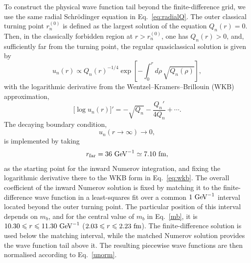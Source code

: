 \documentclass[aps,prd,showpacs,amsmath,twocolumn,superscriptaddress,floatfix,nofootinbib,notitlepage]{revtex4-2}
\newcommand{\be}{\begin{equation}}
\newcommand{\ee}{\end{equation}}
\begin{document}
To construct the physical wave function tail beyond the finite-difference grid, we use the same radial Schr{\"o}dinger equation in Eq.~\eqref{eq:radialQ}. The outer classical turning point $r^{(0)}_n$ is defined as the largest solution of the equation $Q_n(r)=0$. Then, in the classically forbidden region at $r>r^{(0)}_n$, one has $Q_n(r)>0$, and, sufficiently far from the turning point, the regular quasiclassical solution is given by
\be
u_n(r)\propto Q_n(r)^{-1/4}
\exp\left[-\int_0^r d\rho\,\sqrt{Q_n(\rho)}\right],
\label{wkb}
\ee
with the logarithmic derivative from the Wentzel--Kramers--Brillouin (WKB) approximation,
\be
\bigl[\log u_n(r)\bigr]'
=-\sqrt{Q_n}-\frac{Q_n'}{4Q_n}+\cdots.
\label{eq:wkb}
\ee
The decaying boundary condition,
\be
u_n(r\to\infty)\to 0,
\ee
is implemented by taking
\be
r_{\rm far}=36~{\rm GeV}^{-1}\simeq7.10~{\rm fm},
\label{uboundary}
\ee
as the starting point for the inward Numerov integration, and fixing the logarithmic derivative there to the WKB form in Eq.~\eqref{eq:wkb}.
The overall coefficient of the inward Numerov solution is fixed by matching it to the finite-difference wave function in a least-squares fit over a common $1~{\rm GeV}^{-1}$ interval located beyond the outer turning point. The particular position of this interval depends on $m_b$, and for the central value of $m_b$ in Eq.~\eqref{mb}, it is
$10.30\leqslant r\leqslant11.30~{\rm GeV}^{-1}$
($2.03\leqslant r\leqslant2.23~{\rm fm}$).
The finite-difference solution is used below the matching interval, while the matched Numerov solution provides the wave function tail above it. 
The resulting piecewise wave functions are then normalised according to Eq.~\eqref{unorm}.
\end{document}
